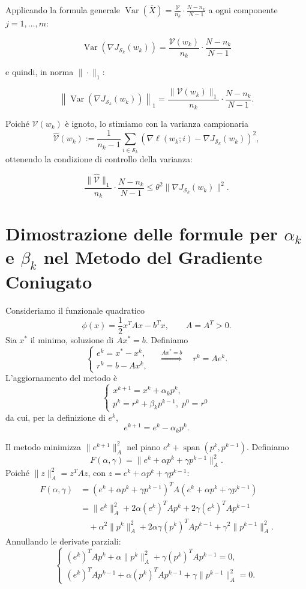 \documentclass[italian, a4paper, twoside, binding=6mm]{sapthesis}
\begin{document}
Applicando la formula generale $\operatorname{Var}(\bar{X}) = \frac{\mathcal{V}}{n_k}\cdot\frac{N-n_k}{N-1}$ a ogni componente $j=1,\dots,m$:

\[
 \operatorname{Var} \left(\nabla J_{\mathcal{S}_k}(w_k)\right) = \frac{\mathcal{V}(w_k)}{n_k} \cdot \frac{N-n_k}{N-1}
\]

e quindi, in norma $\|\cdot\|_1$:

\[
\left\|\operatorname{Var}\left(\nabla J_{\mathcal{S}_k}(w_k)\right)\right\|_1 = \frac{\|\mathcal{V}(w_k)\|_1}{n_k} \cdot \frac{N-n_k}{N-1}.
\]

Poiché $\mathcal{V}(w_k)$ è ignoto, lo stimiamo con la varianza campionaria
\[
\widehat{\mathcal{V}}(w_k) := \frac{1}{n_k-1}\sum_{i\in\mathcal{S}_k}
\left(\nabla \ell(w_k;i) - \nabla J_{\mathcal{S}_k}(w_k)\right)^2,
\]
ottenendo la condizione di controllo della varianza:

\[
\frac{\|\widehat{\mathcal{V}}\|_1}{n_k} \cdot \frac{N-n_k}{N-1} \le \theta^2 \|\nabla J_{\mathcal{S}_k}(w_k)\|^2.
\]
\newpage

\section{Dimostrazione delle formule per $\alpha_k$ e $\beta_k$ nel Metodo del Gradiente Coniugato}
\label{app:cg}

Consideriamo il funzionale quadratico
\[
\phi(x)=\frac12 x^T A x - b^T x, \qquad A=A^T>0. \tag{A.13}
\]
Sia \(x^*\) il minimo, soluzione di \(Ax^*=b\). Definiamo
\[
\begin{cases}
e^k = x^* - x^k, \\
r^k = b - A x^k,
\end{cases}
\quad\overset{Ax^*=b}{\Longrightarrow}\quad
r^k = A e^k. \tag{A.14}
\]
L'aggiornamento del metodo è
\[
\begin{cases}
x^{k+1}=x^k+\alpha_k p^k, \\
p^k=r^k+\beta_k p^{k-1},\; p^0=r^0
\end{cases}
\tag{A.15}
\]
da cui, per la definizione di $e^k$,
\[
e^{k+1}=e^k-\alpha_k p^k. \tag{A.16}
\]

Il metodo minimizza \(\|e^{k+1}\|_A^2\) nel piano \(e^k+\operatorname{span}(p^k,p^{k-1})\).  
Definiamo
\[
F(\alpha,\gamma)=\|e^k+\alpha p^k+\gamma p^{k-1}\|_A^2. \tag{A.17}
\]
Poiché \(\|z\|_A^2 = z^T A z\), con \(z=e^k+\alpha p^k+\gamma p^{k-1}\):
\[
\begin{aligned}
F(\alpha,\gamma)
&= (e^k+\alpha p^k+\gamma p^{k-1})^T A (e^k+\alpha p^k+\gamma p^{k-1}) \\
&= \|e^k\|_A^2+2\alpha(e^k)^T A p^k+2\gamma(e^k)^T A p^{k-1}\\
&\quad+\alpha^2\|p^k\|_A^2+2\alpha\gamma(p^k)^T A p^{k-1}+\gamma^2\|p^{k-1}\|_A^2.
\end{aligned} \tag{A.18}
\]
Annullando le derivate parziali:
\[
\begin{cases}
(e^k)^T A p^k+\alpha\|p^k\|_A^2+\gamma(p^k)^T A p^{k-1}=0,\\[2pt]
(e^k)^T A p^{k-1}+\alpha(p^k)^T A p^{k-1}+\gamma\|p^{k-1}\|_A^2=0.
\end{cases} \tag{A.19}
\]
\end{document}
